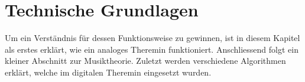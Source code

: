 \clearpage
\section{Technische Grundlagen}\label{sec:Technische Grundlagen}
Um ein Verständnis für dessen Funktionsweise zu gewinnen, ist in diesem Kapitel als erstes erklärt, wie ein analoges Theremin funktioniert. Anschliessend folgt ein kleiner Abschnitt zur Musiktheorie. Zuletzt werden verschiedene Algorithmen erklärt, welche im digitalen Theremin eingesetzt wurden.